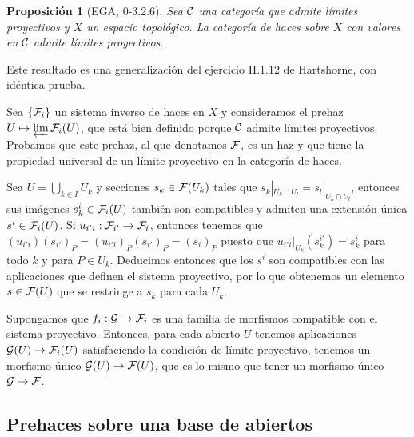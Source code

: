 \documentclass[twoside]{article}
\newtheorem{propo}[defin]{Proposición}
\begin{document}
\begin{propo}[EGA, 0-3.2.6]\label{limite}
Sea ${\mathcal C}$ una categoría que admite límites proyectivos y $X$ un espacio topológico. La categoría de haces sobre $X$ con valores en ${\mathcal C}$ admite límites proyectivos. 
\end{propo}
\begin{dem}
Este resultado es una generalización del ejercicio II.1.12 de Hartshorne, con idéntica prueba.

Sea $\{\mathcal{F}_i\}$ un sistema inverso de haces en $X$ y consideramos el prehaz $U\mapsto\varprojlim\mathcal{F}_i(U)$, que está bien definido porque ${\mathcal C}$ admite límites proyectivos. Probamos que este prehaz, al que denotamos $\mathcal{F}$, es un haz y que tiene la propiedad universal de un límite proyectivo en la categoría de haces. 

Sea $U=\bigcup_{k\in I} U_k$ y secciones $s_k\in\mathcal{F}(U_k)$ tales que $s_k|_{U_k\cap U_l}=s_l|_{U_k\cap U_l}$, entonces sus imágenes $s_k^i\in \mathcal{F}_i(U)$ también son compatibles y admiten una extensión única $s^i\in\mathcal{F}_i(U)$. Si $u_{i'i}:\mathcal{F}_{i'}\to\mathcal{F}_i$, entonces tenemos que $(u_{i'i})(s_{i'})_P=(u_{i'i})_P(s_{i'})_P=(s_i)_P$ puesto que $u_{i'i}|_{U_k}(s^{i'}_k)=s^i_k$ para todo $k$ y para $P\in U_k$. Deducimos entonces que los $s^i$ son compatibles con las aplicaciones que definen el sistema proyectivo, por lo que obtenemos un elemento $s\in\mathcal{F}(U)$ que se restringe a $s_k$ para cada $U_k$. 

Supongamos que $f_i:\mathcal{G}\to\mathcal{F}_i$ es una familia de morfismos compatible con el sistema proyectivo. Entonces, para cada abierto $U$ tenemos aplicaciones $\mathcal{G}(U)\to\mathcal{F}_i(U)$ satisfaciendo la condición de límite proyectivo, tenemos un morfismo único $\mathcal{G}(U)\to\mathcal{F}(U)$, que es lo mismo que tener un morfismo único $\mathcal{G}\to\mathcal{F}$. 

\end{dem}

\subsection{Prehaces sobre una base de abiertos}
\end{document}

